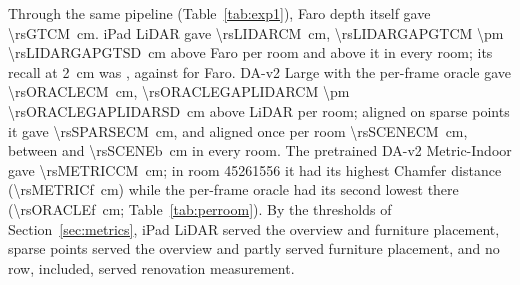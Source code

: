 Through the same pipeline (Table~\ref{tab:exp1}), Faro depth itself gave \SI{\rsGTCM}{cm}. iPad LiDAR gave
\SI{\rsLIDARCM}{cm}, \SI{\rsLIDARGAPGTCM \pm \rsLIDARGAPGTSD}{cm} above Faro per room and above it in every room; its
recall at \SI{2}{cm} was \rsLIDARRtwo{}, against \rsGTRtwo{} for Faro. DA-v2 Large with the per-frame oracle gave
\SI{\rsORACLECM}{cm}, \SI{\rsORACLEGAPLIDARCM \pm \rsORACLEGAPLIDARSD}{cm} above LiDAR per room; aligned on sparse points
it gave \SI{\rsSPARSECM}{cm}, and aligned once per room \SI{\rsSCENECM}{cm}, between \rsSCENEc{} and
\SI{\rsSCENEb}{cm} in every room. The pretrained DA-v2 Metric-Indoor gave \SI{\rsMETRICCM}{cm}; in room 45261556 it had
its highest Chamfer distance (\SI{\rsMETRICf}{cm}) while the per-frame oracle had its second lowest there
(\SI{\rsORACLEf}{cm}; Table~\ref{tab:perroom}). By the thresholds of Section~\ref{sec:metrics}, iPad LiDAR served the
overview and furniture placement, sparse points served the overview and partly served furniture placement, and no
row, \ftmain{} included, served renovation measurement.

